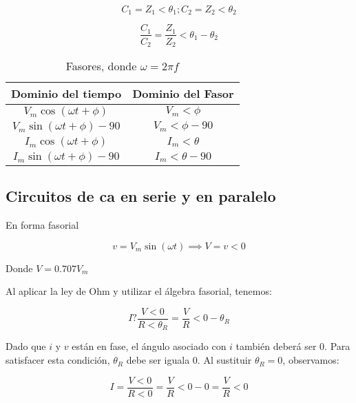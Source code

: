 \begin{equation*}
	C_{1}=Z_{1}<\theta_{1}; C_{2}=Z_{2}<\theta_{2}
\end{equation*}

\begin{equation}
	\frac{C_{1}}{C_{2}}=\frac{Z_{1}}{Z_{2}}<\theta_{1}-\theta_{2}
\end{equation}

\begin{table}[h!]
	\centering
	\begin{tabular}{|c|c|}
		\hline
		\textbf{Dominio del tiempo}   & \textbf{Dominio del Fasor} \\ \hline
		$V_{m}\cos(\omega t+\phi)$    & $V_{m}<\phi$               \\ \hline
		$V_{m}\sin(\omega t+\phi)-90$ & $V_{m}<\phi-90$            \\ \hline
		$I_{m}\cos(\omega t+\phi)$    & $I_{m}<\theta$             \\ \hline
		$I_{m}\sin(\omega t+\phi)-90$ & $I_{m}<\theta-90$          \\ \hline
	\end{tabular}
	\caption{Fasores, donde $\omega=2\pi f$}
	\label{tabelec3}
\end{table}

\subsection{Circuitos de ca en serie y en paralelo}

En forma fasorial

\begin{equation}
	v=V_{m}\sin (\omega t)\implies V=v<0
\end{equation}

Donde $V=0.707V_{m}$

Al aplicar la ley de Ohm y utilizar el álgebra fasorial, tenemos:

\begin{equation}
	I?\frac{V<0}{R<\theta_{R}}=\frac{V}{R}<0-\theta_{R}
\end{equation}

Dado que $i$ y $v$ están en fase, el ángulo asociado con $i$ también deberá ser 0. Para satisfacer esta condición, $\theta_{R}$
debe ser iguala  0. Al sustituir $\theta_{R}=0$, observamos:

\begin{equation}
	I=\frac{V<0}{R<0}=\frac{V}{R}<0-0=\frac{V}{R}<0
\end{equation}

